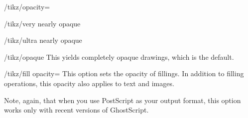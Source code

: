 \begin{key}{/tikz/opacity=}
  \begin{stylekey}{/tikz/very nearly opaque} 
\begin{codeexample}[]
\end{codeexample}
  \end{stylekey}

  \begin{stylekey}{/tikz/ultra nearly opaque}
\begin{codeexample}[]
\end{codeexample}
  \end{stylekey}

  \begin{stylekey}{/tikz/opaque}
    This yields completely opaque drawings, which is the default.
\begin{codeexample}[]
\end{codeexample}
  \end{stylekey}
\end{key}


\begin{key}{/tikz/fill opacity=}
  This option sets the opacity of fillings. In addition to filling
  operations, this opacity also applies to text and images.

  Note, again, that when you use PostScript as your output format,
  this option works only with recent versions of GhostScript.
  
\begin{codeexample}[]
\end{codeexample}

\begin{codeexample}[]
\end{codeexample}
\end{key}

